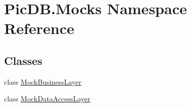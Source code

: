 \hypertarget{namespace_pic_d_b_1_1_mocks}{}\section{Pic\+D\+B.\+Mocks Namespace Reference}
\label{namespace_pic_d_b_1_1_mocks}
\subsection*{Classes}
\begin{DoxyCompactItemize}
\item 
class \mbox{\hyperlink{class_pic_d_b_1_1_mocks_1_1_mock_business_layer}{Mock\+Business\+Layer}}
\item 
class \mbox{\hyperlink{class_pic_d_b_1_1_mocks_1_1_mock_data_access_layer}{Mock\+Data\+Access\+Layer}}
\end{DoxyCompactItemize}
